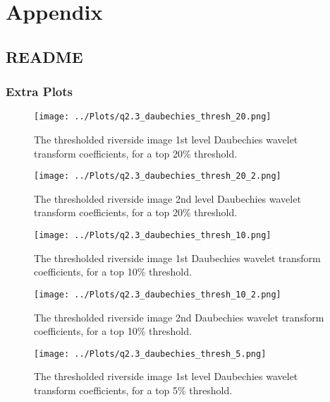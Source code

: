 \documentclass[12pt]{report} %
\begin{document}
\chapter{Appendix}

\section{README}

\subsection{Extra Plots}

\begin{figure}[htbp]
    \centering
    \texttt{[image: ../Plots/q2.3\_daubechies\_thresh\_20.png]}
    \caption{The thresholded riverside image 1st level Daubechies wavelet transform coefficients, for a top 20\% threshold.}
    \label{fig:thresholded_image20}
\end{figure}

\begin{figure}[htbp]
    \centering
    \texttt{[image: ../Plots/q2.3\_daubechies\_thresh\_20\_2.png]}
    \caption{The thresholded riverside image 2nd level Daubechies wavelet transform coefficients, for a top 20\% threshold.}
    \label{fig:thresholded_image20_2}
\end{figure}

\begin{figure}[htbp]
    \centering
    \texttt{[image: ../Plots/q2.3\_daubechies\_thresh\_10.png]}
    \caption{The thresholded riverside image 1st Daubechies wavelet transform coefficients, for a top 10\% threshold.}
    \label{fig:thresholded_image10}
\end{figure}

\begin{figure}[htbp]
    \centering
    \texttt{[image: ../Plots/q2.3\_daubechies\_thresh\_10\_2.png]}
    \caption{The thresholded riverside image 2nd Daubechies wavelet transform coefficients, for a top 10\% threshold.}
    \label{fig:thresholded_image10_2}
\end{figure}

\begin{figure}[htbp]
    \centering
    \texttt{[image: ../Plots/q2.3\_daubechies\_thresh\_5.png]}
    \caption{The thresholded riverside image 1st level Daubechies wavelet transform coefficients, for a top 5\% threshold.}
    \label{fig:thresholded_image5}
\end{figure}
\end{document}
